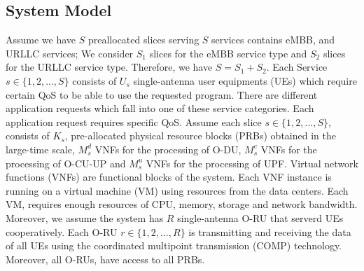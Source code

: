 \documentclass[conference]{IEEEtran}
\begin{document}
\subsection{System Model}
Assume we have $S$ preallocated slices serving $S$ services contains eMBB, and URLLC services; We consider $S_1$ slices for the eMBB service type and $S_2$ slices for the URLLC service type. Therefore, we have $S=S_1+S_2$.
Each Service $s\in \{1,2,...,S\} $ consists of $U_{s}$ single-antenna user equipments (UEs) which require certain QoS to be able to use the requested program.
There are different application requests which fall into one of these service categories. Each application request requires specific QoS.
Assume each slice $s \in \{1,2,...,S \}$, consists of $K_{s}$, pre-allocated physical resource blocks (PRBs) obtained in the large-time scale, $M_s^{d}$ VNFs for the processing of O-DU, $M_s^{c}$ VNFs for the processing of O-CU-UP and $M_s^{u}$ VNFs for the processing of UPF. 
Virtual network functions (VNFs) are functional blocks of the system. Each VNF instance is running on a virtual machine (VM) using resources from the data centers. Each VM, requires enough resources of CPU, memory, storage and network bandwidth.
Moreover, we assume the system has $R$ single-antenna O-RU that serverd UEs cooperatively. Each O-RU $r \in \{1,2,...,R \}$ is transmitting and receiving the data of all UEs using the coordinated multipoint transmission (COMP) technology. Moreover, all O-RUs, have access to all PRBs.
\end{document}
